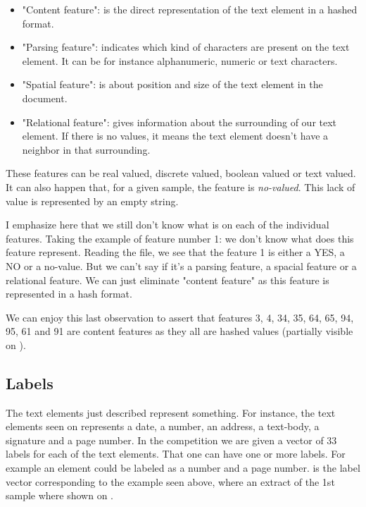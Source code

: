 		\begin{itemize}
			\item "Content feature": is the direct representation of the text element in a hashed format.
			\item "Parsing feature": indicates which kind of characters are present on the text element. It can be for instance alphanumeric, numeric or text characters.
			\item "Spatial feature": is about position and size of the text element in the document.
		 	\item "Relational feature": gives information about the surrounding of our text element. If there is no values, it means the text element doesn't have a neighbor in that surrounding.
		\end{itemize}

		These features can be real valued, discrete valued, boolean valued or text valued. It can also happen that, for a given sample, the feature is \textit{no-valued}. This lack of value is represented by an empty string.

		I emphasize here that we still don't know what is on each of the individual features. Taking the example of feature number 1: we don't know what does this feature represent. Reading the file, we see that the feature 1 is either a YES, a NO or a no-value. But we can't say if it's a parsing feature, a spacial feature or a relational feature. We can just eliminate "content feature" as this feature is represented in a hash format.

		We can enjoy this last observation to assert that features 3, 4, 34, 35, 64, 65, 94, 95, 61 and 91 are content features as they all are hashed values (partially visible on ).

	\subsection{Labels}
		The text elements just described represent something. For instance, the text elements seen on  represents a date, a number, an address, a text-body, a signature and a page number. In the competition we are given a vector of 33 labels for each of the text elements. That one can have one or more labels. For example an element could be labeled as a number and a page number.  is the label vector corresponding to the example seen above, where an extract of the 1st sample where shown on .


